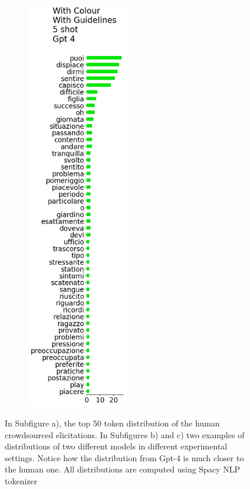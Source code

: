 \begin{figure}[!htbp]
\begin{subfigure}[t]{0.2\textwidth}
        \includegraphics[height=18cm]{assets/imgs/tokens-vertical/token_distribution_with_color_with_guidelines_5_shot_gpt-4.png}
            \label{sub:persona-narrative-elicitation-comparison-distribution-gpt-4}
    \end{subfigure}
    \caption{In Subfigure a), the top 50 token distribution of the human crowdsourced elicitations. In Subfigures b) and c) two examples of distributions of two different models in different experimental settings. Notice how the distribution from Gpt-4 is much closer to the human one. All distributions are computed using Spacy NLP tokenizer}
    \label{fig:persona-narrative-elicitation-comparison-distribution}
\end{figure}

